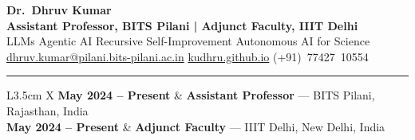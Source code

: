 \documentclass[10pt, a4paper]{article}
\newcommand{\cvsec}[1]{%
  \vspace{1.0em}%
  \noindent{\large\bfseries\color{AccentBlue}#1}%
  \par\vspace{-0.42em}%
  {\color{AccentBlue}\rule{\linewidth}{1.2pt}}\par%
  \vspace{0.45em}%
}
\begin{document}
\thispagestyle{empty}


\vspace{-0.55cm}
\begin{minipage}[t]{\linewidth}
  \color{white}
  {\fontsize{22}{27}\selectfont\bfseries Dr.\ Dhruv Kumar}\\[0.25em]
  {\normalsize\bfseries Assistant Professor, BITS Pilani \;|\; Adjunct Faculty, IIIT Delhi}\\[0.22em]
  {\small LLMs \;\textbullet\;
         Agentic AI \;\textbullet\;
         Recursive Self-Improvement \;\textbullet\;
         Autonomous AI for Science}\\[0.5em]
  {\hypersetup{urlcolor=white}\footnotesize
   \href{mailto:dhruv.kumar@pilani.bits-pilani.ac.in}{dhruv.kumar@pilani.bits-pilani.ac.in}
   \;\textbullet\;
   \href{https://kudhru.github.io}{kudhru.github.io}
   \;\textbullet\;
   (+91)\ 77427\ 10554}
\end{minipage}

\vspace{3.0em}

\cvsec{Affiliations}

\renewcommand{\arraystretch}{1.3}
\setlength{\tabcolsep}{5pt}


\vspace{0.25em}
\begin{tabularx}{\linewidth}{L{3.5cm} X}
  \small\textbf{May 2024 – Present} & \small\textbf{Assistant Professor} — BITS Pilani, Rajasthan, India \\
  \small\textbf{May 2024 – Present} & \small\textbf{Adjunct Faculty} — IIIT Delhi, New Delhi, India \\
\end{tabularx}

\vspace{0.6em}
\end{document}
